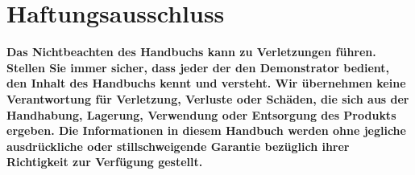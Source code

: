 %
%

\chapter{Haftungsausschluss}

\textbf{Das Nichtbeachten des Handbuchs kann zu Verletzungen führen. Stellen Sie immer sicher, dass jeder der den Demonstrator bedient, den Inhalt des Handbuchs kennt und versteht. Wir übernehmen keine Verantwortung für Verletzung, Verluste oder Schäden, die sich aus der Handhabung, Lagerung, Verwendung oder Entsorgung des Produkts ergeben.  Die Informationen in diesem
	Handbuch werden ohne jegliche ausdrückliche oder stillschweigende Garantie bezüglich ihrer
	Richtigkeit zur Verfügung gestellt.  }

